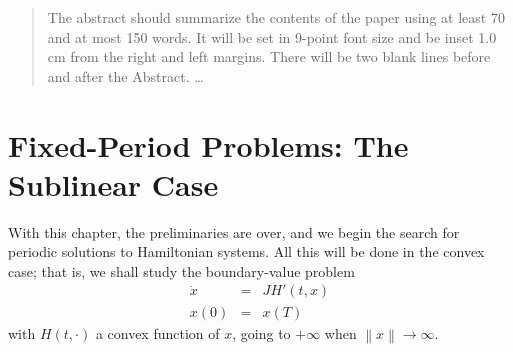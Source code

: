 \documentclass{llncs}
\begin{document}
\author{Ivar Ekeland \and Roger Temam}


\maketitle
%
\makeatletter
\renewenvironment{thebibliography}[1]
     {\section*{\refname}
      \small
      \list{}%
           {\settowidth\labelwidth{}%
            \leftmargin\parindent
            \itemindent=-\parindent
            \labelsep=\z@
            \if@openbib
              \advance\leftmargin\bibindent
              \itemindent -\bibindent
              \listparindent \itemindent
              \parsep \z@
            \fi
            \usecounter{enumiv}%
            \let\p@enumiv\@empty
            \renewcommand\theenumiv{}}%
      \if@openbib
        \renewcommand\newblock{\par}%
      \else
        \renewcommand\newblock{\hskip .11em \@plus.33em \@minus.07em}%
      \fi
      \sloppy\clubpenalty4000\widowpenalty4000%
      \sfcode`\.=\@m}
     {\def\@noitemerr
       {\@latex@warning{Empty `thebibliography' environment}}%
      \endlist}
      \def\@cite#1{#1}%
      \def\@lbibitem[#1]#2{\item[]\if@filesw
        {\def\protect##1{\string ##1\space}\immediate
      \write\@auxout{\string\bibcite{#2}{#1}}}\fi\ignorespaces}
\makeatother
%
\begin{abstract}
The abstract should summarize the contents of the paper
using at least 70 and at most 150 words. It will be set in 9-point
font size and be inset 1.0 cm from the right and left margins.
There will be two blank lines before and after the Abstract. \dots
{}
\end{abstract}
%
\section{Fixed-Period Problems: The Sublinear Case}
%
With this chapter, the preliminaries are over, and we begin the search
for periodic solutions to Hamiltonian systems. All this will be done in
the convex case; that is, we shall study the boundary-value problem
\begin{eqnarray*}
  \dot{x}&=&JH' (t,x)\\
  x(0) &=& x(T)
\end{eqnarray*}
with $H(t,\cdot)$ a convex function of $x$, going to $+\infty$ when
$\left\|x\right\| \to \infty$.
\end{document}
